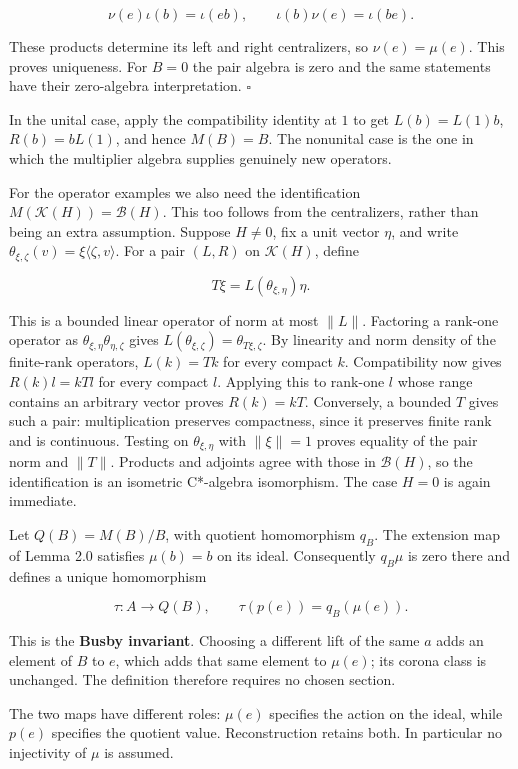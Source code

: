 \documentclass[
  11pt,
]{article}
\begin{document}
\[
\nu(e)\iota(b)=\iota(eb),
\qquad
\iota(b)\nu(e)=\iota(be).
\]

These products determine its left and right centralizers, so
\(\nu(e)=\mu(e)\). This proves uniqueness. For \(B=0\) the pair algebra
is zero and the same statements have their zero-algebra interpretation.
\(\square\)

In the unital case, apply the compatibility identity at \(1\) to get
\(L(b)=L(1)b\), \(R(b)=bL(1)\), and hence \(M(B)=B\). The nonunital case
is the one in which the multiplier algebra supplies genuinely new
operators.

For the operator examples we also need the identification
\(M(\mathcal K(H))=\mathcal B(H)\). This too follows from the
centralizers, rather than being an extra assumption. Suppose \(H\ne0\),
fix a unit vector \(\eta\), and write
\(\theta_{\xi,\zeta}(v)=\xi\langle\zeta,v\rangle\). For a pair \((L,R)\)
on \(\mathcal K(H)\), define

\[
T\xi=L(\theta_{\xi,\eta})\eta.
\]

This is a bounded linear operator of norm at most \(\|L\|\). Factoring a
rank-one operator as \(\theta_{\xi,\eta}\theta_{\eta,\zeta}\) gives
\(L(\theta_{\xi,\zeta})=\theta_{T\xi,\zeta}\). By linearity and norm
density of the finite-rank operators, \(L(k)=Tk\) for every compact
\(k\). Compatibility now gives \(R(k)l=kTl\) for every compact \(l\).
Applying this to rank-one \(l\) whose range contains an arbitrary vector
proves \(R(k)=kT\). Conversely, a bounded \(T\) gives such a pair:
multiplication preserves compactness, since it preserves finite rank and
is continuous. Testing on \(\theta_{\xi,\eta}\) with \(\|\xi\|=1\)
proves equality of the pair norm and \(\|T\|\). Products and adjoints
agree with those in \(\mathcal B(H)\), so the identification is an
isometric C*-algebra isomorphism. The case \(H=0\) is again immediate.

Let \(Q(B)=M(B)/B\), with quotient homomorphism \(q_B\). The extension
map of Lemma 2.0 satisfies \(\mu(b)=b\) on its ideal. Consequently
\(q_B\mu\) is zero there and defines a unique homomorphism

\[
\tau:A\longrightarrow Q(B),
\qquad
\tau(p(e))=q_B(\mu(e)).
\]

This is the \textbf{Busby invariant}. Choosing a different lift of the
same \(a\) adds an element of \(B\) to \(e\), which adds that same
element to \(\mu(e)\); its corona class is unchanged. The definition
therefore requires no chosen section.

The two maps have different roles: \(\mu(e)\) specifies the action on
the ideal, while \(p(e)\) specifies the quotient value. Reconstruction
retains both. In particular no injectivity of \(\mu\) is assumed.
\end{document}
